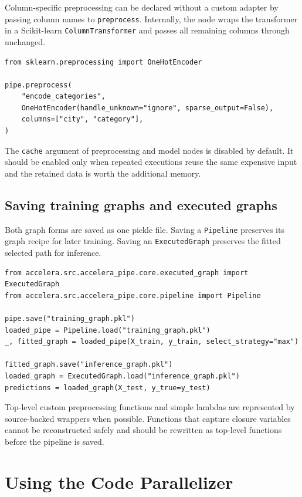 \documentclass[12pt,a4paper]{report}
\begin{document}
Column-specific preprocessing can be declared without a custom adapter by
passing column names to \texttt{preprocess}. Internally, the node wraps the
transformer in a Scikit-learn \texttt{ColumnTransformer} and passes all remaining
columns through unchanged.

\begin{lstlisting}[style=code,caption={Applying a transformer to selected columns}]
from sklearn.preprocessing import OneHotEncoder

pipe.preprocess(
    "encode_categories",
    OneHotEncoder(handle_unknown="ignore", sparse_output=False),
    columns=["city", "category"],
)
\end{lstlisting}

The \texttt{cache} argument of preprocessing and model nodes is disabled by
default. It should be enabled only when repeated executions reuse the same
expensive input and the retained data is worth the additional memory.

\subsection{Saving training graphs and executed graphs}
Both graph forms are saved as one pickle file. Saving a \texttt{Pipeline}
preserves its graph recipe for later training. Saving an
\texttt{ExecutedGraph} preserves the fitted selected path for inference.

\begin{lstlisting}[style=code,caption={Saving and loading Accelera Pipe graphs}]
from accelera.src.accelera_pipe.core.executed_graph import ExecutedGraph
from accelera.src.accelera_pipe.core.pipeline import Pipeline

pipe.save("training_graph.pkl")
loaded_pipe = Pipeline.load("training_graph.pkl")
_, fitted_graph = loaded_pipe(X_train, y_train, select_strategy="max")

fitted_graph.save("inference_graph.pkl")
loaded_graph = ExecutedGraph.load("inference_graph.pkl")
predictions = loaded_graph(X_test, y_true=y_test)
\end{lstlisting}

Top-level custom preprocessing functions and simple lambdas are represented by
source-backed wrappers when possible. Functions that capture closure variables
cannot be reconstructed safely and should be rewritten as top-level functions
before the pipeline is saved.

\section{Using the Code Parallelizer}
\end{document}
